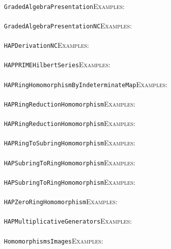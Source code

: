 \documentclass[a4paper,11pt]{report}
\begin{document}
{{ \\
 \texttt{GradedAlgebraPresentation}{\nobreakspace}{\nobreakspace}{\nobreakspace}{\nobreakspace}\textsc{Examples:} \\
 \\
 \texttt{GradedAlgebraPresentationNC}{\nobreakspace}{\nobreakspace}{\nobreakspace}{\nobreakspace}\textsc{Examples:} \\
 \\
 \texttt{HAPDerivationNC}{\nobreakspace}{\nobreakspace}{\nobreakspace}{\nobreakspace}\textsc{Examples:} \\
 \\
 \texttt{HAPPRIME{\textunderscore}HilbertSeries}{\nobreakspace}{\nobreakspace}{\nobreakspace}{\nobreakspace}\textsc{Examples:} \\
 \\
 \texttt{HAPRingHomomorphismByIndeterminateMap}{\nobreakspace}{\nobreakspace}{\nobreakspace}{\nobreakspace}\textsc{Examples:} \\
 \\
 \texttt{HAPRingReductionHomomorphism}{\nobreakspace}{\nobreakspace}{\nobreakspace}{\nobreakspace}\textsc{Examples:} \\
 \\
 \texttt{HAPRingReductionHomomorphism}{\nobreakspace}{\nobreakspace}{\nobreakspace}{\nobreakspace}\textsc{Examples:} \\
 \\
 \texttt{HAPRingToSubringHomomorphism}{\nobreakspace}{\nobreakspace}{\nobreakspace}{\nobreakspace}\textsc{Examples:} \\
 \\
 \texttt{HAPSubringToRingHomomorphism}{\nobreakspace}{\nobreakspace}{\nobreakspace}{\nobreakspace}\textsc{Examples:} \\
 \\
 \texttt{HAPSubringToRingHomomorphism}{\nobreakspace}{\nobreakspace}{\nobreakspace}{\nobreakspace}\textsc{Examples:} \\
 \\
 \texttt{HAPZeroRingHomomorphism}{\nobreakspace}{\nobreakspace}{\nobreakspace}{\nobreakspace}\textsc{Examples:} \\
 \\
 \texttt{HAP{\textunderscore}MultiplicativeGenerators}{\nobreakspace}{\nobreakspace}{\nobreakspace}{\nobreakspace}\textsc{Examples:} \\
 \\
 \texttt{HomomorphismsImages}{\nobreakspace}{\nobreakspace}{\nobreakspace}{\nobreakspace}\textsc{Examples:} \\
}}
\end{document}
